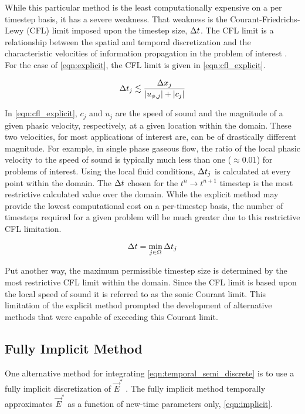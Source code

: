 While this particular method is the least computationally expensive on a per timestep basis, it has a severe weakness.
That weakness is the Courant-Friedrichs-Lewy (CFL) limit imposed upon the timestep size, $\dt{}$.
The CFL limit is a relationship between the spatial and temporal discretization and the characteristic velocities of information propagation in the problem of interest \cite{LeVeque2007, Tannehill1997}.
For the case of \eqref{eqn:explicit}, the CFL limit is given in \eqref{eqn:cfl_explicit}.

\begin{equation}
\label{eqn:cfl_explicit}
\dt{}_j \lesssim \frac{\dx{}_j}{|u_{\phi,j}|+|c_j|}
\end{equation}

In \eqref{eqn:cfl_explicit}, $c_j$ and $u_j$ are the speed of sound and the magnitude of a given phasic velocity, respectively, at a given location within the domain.
These two velocities, for most applications of interest are, can be of drastically different magnitude.
For example, in single phase gaseous flow, the ratio of the local phasic velocity to the speed of sound is typically much less than one ($\approx 0.01$) for problems of interest.
Using the local fluid conditions, $\dt{}_j$ is calculated at every point within the domain.
The $\dt{}$ chosen for the $t^{n} \rightarrow t^{n+1}$ timestep is the most restrictive calculated value over the domain.
While the explicit method may provide the lowest computational cost on a per-timestep basis, the number of timesteps required for a given problem will be much greater due to this restrictive CFL limitation.

\begin{equation}
\label{eqn:global_cfl}
\dt{} = \min_{j \in \Omega} \dt{}_j
\end{equation}

Put another way, the maximum permissible timestep size is determined by the most restrictive CFL limit within the domain.
Since the CFL limit is based upon the local speed of sound it is referred to as the sonic Courant limit.
This limitation of the explicit method prompted the development of alternative methods that were capable of exceeding this Courant limit.

\subsection{Fully Implicit Method}
\label{subsect:numerics_fully_implicit}
One alternative method for integrating \eqref{eqn:temporal_semi_discrete} is to use a fully implicit discretization of $\vec{E}^{*}$ \cite{Frepoli2003, Barre1990}.
The fully implicit method temporally approximates $\vec{E}^{*}$ as a function  of new-time parameters only, \eqref{eqn:implicit}.

